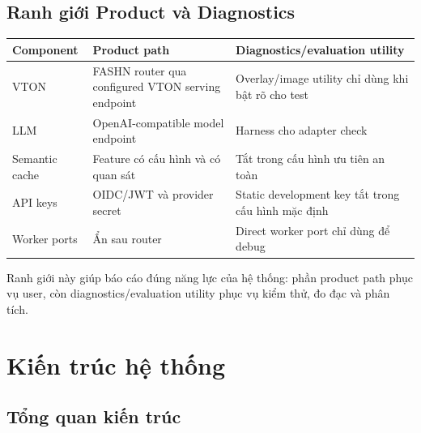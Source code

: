 \documentclass[12pt,a4paper,oneside]{report}
\begin{document}
\section{Ranh giới Product và Diagnostics}

\begin{longtable}{p{3.1cm}p{5.55cm}p{5.55cm}}
\toprule
\textbf{Component} & \textbf{Product path} & \textbf{Diagnostics/evaluation utility} \\
\midrule
VTON & FASHN router qua configured VTON serving endpoint & Overlay/image utility chỉ dùng khi bật rõ cho test \\
LLM & OpenAI-compatible model endpoint & Harness cho adapter check \\
Semantic cache & Feature có cấu hình và có quan sát & Tắt trong cấu hình ưu tiên an toàn \\
API keys & OIDC/JWT và provider secret & Static development key tắt trong cấu hình mặc định \\
Worker ports & Ẩn sau router & Direct worker port chỉ dùng để debug \\
\bottomrule
\end{longtable}

Ranh giới này giúp báo cáo đúng năng lực của hệ thống: phần product path phục vụ user, còn diagnostics/evaluation utility phục vụ kiểm thử, đo đạc và phân tích.

\chapter{Kiến trúc hệ thống}

\section{Tổng quan kiến trúc}
\end{document}
